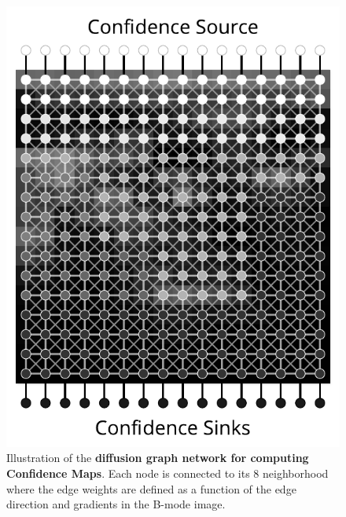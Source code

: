 \begin{figure}[ht]
	\centering
	\includegraphics[width=0.5\linewidth]{./figures/cudacm/diffusion_problem_8n.pdf}
	\caption{Illustration of the \textbf{diffusion graph network for computing Confidence Maps}. Each node is connected to its 8 neighborhood where the edge weights are defined as a function of the edge direction and gradients in the B-mode image.}
	\label{fig:cudacm:diffusion-graph}
\end{figure}

